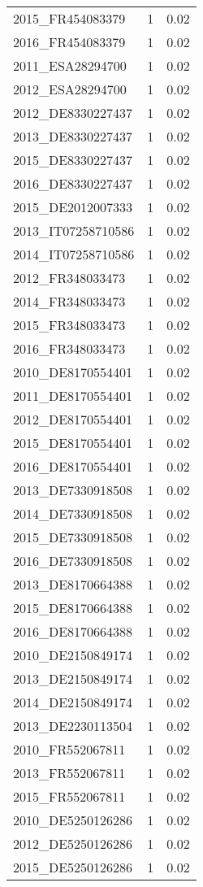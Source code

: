 \begin{table*}[htbp]
\begin{tabular}{lrr}
2015_FR454083379 & 1 & 0.02 \\
2016_FR454083379 & 1 & 0.02 \\
2011_ESA28294700 & 1 & 0.02 \\
2012_ESA28294700 & 1 & 0.02 \\
2012_DE8330227437 & 1 & 0.02 \\
2013_DE8330227437 & 1 & 0.02 \\
2015_DE8330227437 & 1 & 0.02 \\
2016_DE8330227437 & 1 & 0.02 \\
2015_DE2012007333 & 1 & 0.02 \\
2013_IT07258710586 & 1 & 0.02 \\
2014_IT07258710586 & 1 & 0.02 \\
2012_FR348033473 & 1 & 0.02 \\
2014_FR348033473 & 1 & 0.02 \\
2015_FR348033473 & 1 & 0.02 \\
2016_FR348033473 & 1 & 0.02 \\
2010_DE8170554401 & 1 & 0.02 \\
2011_DE8170554401 & 1 & 0.02 \\
2012_DE8170554401 & 1 & 0.02 \\
2015_DE8170554401 & 1 & 0.02 \\
2016_DE8170554401 & 1 & 0.02 \\
2013_DE7330918508 & 1 & 0.02 \\
2014_DE7330918508 & 1 & 0.02 \\
2015_DE7330918508 & 1 & 0.02 \\
2016_DE7330918508 & 1 & 0.02 \\
2013_DE8170664388 & 1 & 0.02 \\
2015_DE8170664388 & 1 & 0.02 \\
2016_DE8170664388 & 1 & 0.02 \\
2010_DE2150849174 & 1 & 0.02 \\
2013_DE2150849174 & 1 & 0.02 \\
2014_DE2150849174 & 1 & 0.02 \\
2013_DE2230113504 & 1 & 0.02 \\
2010_FR552067811 & 1 & 0.02 \\
2013_FR552067811 & 1 & 0.02 \\
2015_FR552067811 & 1 & 0.02 \\
2010_DE5250126286 & 1 & 0.02 \\
2012_DE5250126286 & 1 & 0.02 \\
2015_DE5250126286 & 1 & 0.02 \\

\end{tabular}
\end{table*}
